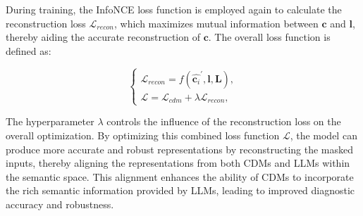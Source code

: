 During training, the InfoNCE loss function is employed again to calculate the reconstruction loss $\mathcal{L}_{recon}$, which maximizes mutual information between $\mathbf{c}$ and $\mathbf{l}$, thereby aiding the accurate reconstruction of $\mathbf{c}$. The overall loss function is defined as:

\begin{equation}
    \left\{\begin{matrix}
    \mathcal{L}_{recon}=f(\widehat{\mathbf{c}_i}^\prime, \mathbf{l}, \mathbf{L}), \\
    \mathcal{L}=\mathcal{L}_{cdm}+\lambda\mathcal{L}_{recon},
    \end{matrix}\right.
\end{equation}

The hyperparameter $\lambda$ controls the influence of the reconstruction loss on the overall optimization. By optimizing this combined loss function $\mathcal{L}$, the model can produce more accurate and robust representations by reconstructing the masked inputs, thereby aligning the representations from both CDMs and LLMs within the semantic space. This alignment enhances the ability of CDMs to incorporate the rich semantic information provided by LLMs, leading to improved diagnostic accuracy and robustness.



